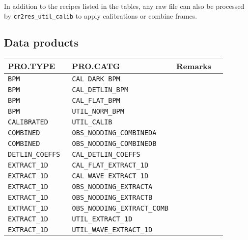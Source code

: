 In addition to the recipes listed in the tables, any raw file can also be processed by \verb!cr2res_util_calib! to apply calibrations or combine frames.





\subsection{Data products}
\label{sec:data-prods}
\begin{tabularx}{\linewidth}{|X|X|X|X|}
    \hline
    \multicolumn{1}{|l|}{\textbf{PRO.TYPE}} &
    \multicolumn{1}{l|}{\textbf{PRO.CATG}} &
    \multicolumn{1}{l|}{\textbf{Remarks}} \\
    \hline
\texttt{BPM              } & \texttt{CAL\_DARK\_BPM}                & \\
\texttt{BPM              } & \texttt{CAL\_DETLIN\_BPM}              & \\
\texttt{BPM              } & \texttt{CAL\_FLAT\_BPM}                & \\
\texttt{BPM              } & \texttt{UTIL\_NORM\_BPM}               & \\
\texttt{CALIBRATED       } & \texttt{UTIL\_CALIB}                  & \\
\texttt{COMBINED         } & \texttt{OBS\_NODDING\_COMBINEDA}       & \\
\texttt{COMBINED         } & \texttt{OBS\_NODDING\_COMBINEDB}       & \\
\texttt{DETLIN\_COEFFS    } & \texttt{CAL\_DETLIN\_COEFFS}           & \\
\texttt{EXTRACT\_1D       } & \texttt{CAL\_FLAT\_EXTRACT\_1D}         & \\
\texttt{EXTRACT\_1D       } & \texttt{CAL\_WAVE\_EXTRACT\_1D}         & \\
\texttt{EXTRACT\_1D       } & \texttt{OBS\_NODDING\_EXTRACTA}        & \\
\texttt{EXTRACT\_1D       } & \texttt{OBS\_NODDING\_EXTRACTB}        & \\
\texttt{EXTRACT\_1D       } & \texttt{OBS\_NODDING\_EXTRACT\_COMB}    & \\
\texttt{EXTRACT\_1D       } & \texttt{UTIL\_EXTRACT\_1D}             & \\
\texttt{EXTRACT\_1D       } & \texttt{UTIL\_WAVE\_EXTRACT\_1D}        & \\

\end{tabularx}
